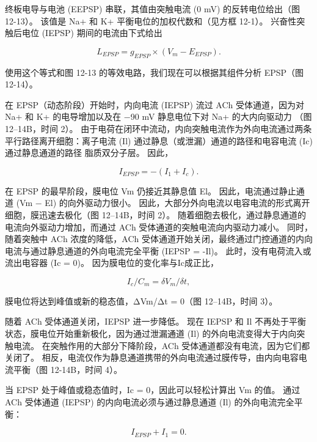 终板电导与电池 (EEPSP) 串联，其值由突触电流 (0 mV) 的反转电位给出（图 12-13）。 该值是 Na+ 和 K+ 平衡电位的加权代数和（见方框 12-1）。 兴奋性突触后电位 (IEPSP) 期间的电流由下式给出

\begin{equation}\label{excitatory_potential}
	L_{EPSP} = g_{EPSP} \times (V_m - E_{EPSP}).
\end{equation}

使用这个等式和图 12-13 的等效电路，我们现在可以根据其组件分析 EPSP（图 12-14）。

在 EPSP（动态阶段）开始时，内向电流 (IEPSP) 流过 ACh 受体通道，因为对 Na+ 和 K+ 的电导增加以及在 −90 mV 静息电位下对 Na+ 的大内向驱动力 （图 12–14B，时间 2）。 由于电荷在闭环中流动，内向突触电流作为外向电流通过两条平行路径离开细胞：离子电流 (Il) 通过静息（或泄漏）通道的路径和电容电流 (Ic) 通过静息通道的路径 脂质双分子层。 因此，

\begin{equation}\label{ionic_current}
	I_{EPSP} = -(I_1 + I_c).
\end{equation}

在 EPSP 的最早阶段，膜电位 Vm 仍接近其静息值 El。 因此，电流通过静止通道 (Vm − El) 的向外驱动力很小。 因此，大部分外向电流以电容电流的形式离开细胞，膜迅速去极化（图 12–14B，时间 2）。 随着细胞去极化，通过静息通道的电流向外驱动力增加，而通过 ACh 受体通道的突触电流向内驱动力减小。 同时，随着突触中 ACh 浓度的降低，ACh 受体通道开始关闭，最终通过门控通道的内向电流与通过静息通道的外向电流完全平衡 (IEPSP = -Il)。 此时，没有电荷流入或流出电容器 (Ic = 0)。 因为膜电位的变化率与Ic成正比，

\begin{equation}\label{rate_potential}
	I_c / C_m = \delta V_m / \delta t,
\end{equation}

膜电位将达到峰值或新的稳态值，ΔVm/Δt = 0（图 12–14B，时间 3）。

随着 ACh 受体通道关闭，IEPSP 进一步降低。 现在 IEPSP 和 Il 不再处于平衡状态，膜电位开始重新极化，因为通过泄漏通道 (Il) 的外向电流变得大于内向突触电流。 在突触作用的大部分下降阶段，ACh 受体通道都没有电流，因为它们都关闭了。 相反，电流仅作为静息通道携带的外向电流通过膜传导，由内向电容电流平衡（图 12-14B，时间 4）。

当 EPSP 处于峰值或稳态值时，Ic = 0，因此可以轻松计算出 Vm 的值。 通过 ACh 受体通道 (IEPSP) 的内向电流必须与通过静息通道 (Il) 的外向电流完全平衡：

\begin{equation}\label{outward_current}
	I_{EPSP} + I_1 = 0.
\end{equation}

